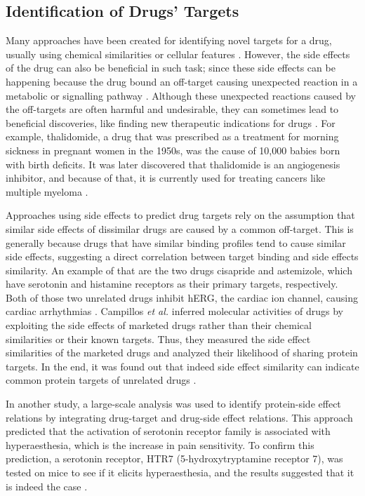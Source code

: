 \subsection{Identification of Drugs' Targets}
Many approaches have been created for identifying novel targets for a drug, usually using chemical similarities or cellular features \cite{campillos_drug_2008}. However, the side effects of the drug can also be beneficial in such task; since these side effects can be happening because the drug bound an off-target causing unexpected reaction in a metabolic or signalling pathway \cite{lotfi_shahreza_review_2018}. Although these unexpected reactions caused by the off-targets are often harmful and undesirable, they can sometimes lead to beneficial discoveries, like finding new therapeutic indications for drugs \cite{campillos_drug_2008}. For example, thalidomide, a drug that was prescribed as a treatment for morning sickness in pregnant women in the 1950s, was the cause of 10,000 babies born with birth deficits. It was later discovered that thalidomide is an angiogenesis inhibitor, and because of that, it is currently used for treating cancers like multiple myeloma \cite{vargesson_thalidomideinduced_2015}.

Approaches using side effects to predict drug targets rely on the assumption that similar side effects of dissimilar drugs are caused by a common off-target. This is generally because drugs that have similar binding profiles tend to cause similar side effects, suggesting a direct correlation between target binding and side effects similarity. An example of that are the two drugs cisapride and astemizole, which have serotonin and histamine receptors as their primary targets, respectively. Both of those two unrelated drugs inhibit hERG, the cardiac ion channel, causing cardiac arrhythmias \cite{campillos_drug_2008}.
Campillos \textit{et al.} inferred molecular activities of drugs by exploiting the side effects of marketed drugs rather than their chemical similarities or their known targets. Thus, they measured the side effect similarities of the marketed drugs and analyzed their likelihood of sharing protein targets. In the end, it was found out that indeed side effect similarity can indicate common protein targets of unrelated drugs \cite{campillos_drug_2008}.

In another study, a large-scale analysis was used to identify protein-side effect relations by integrating drug-target and drug-side effect relations. This approach predicted that the activation of serotonin receptor family is associated with hyperaesthesia, which is the increase in pain sensitivity. To confirm this prediction, a serotonin receptor, HTR7 (5-hydroxytryptamine receptor 7), was tested on mice to see if it elicits hyperaesthesia, and the results suggested that it is indeed the case \cite{kuhn_systematic_2014}.

